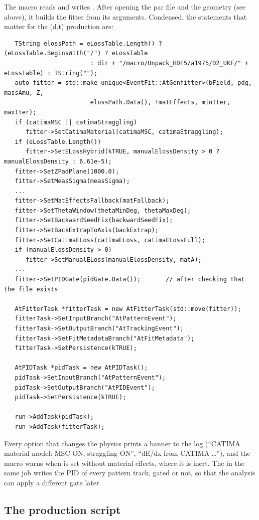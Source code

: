 The macro reads  and writes .
After opening the par file and the geometry (see above), it builds the fitter from its arguments. Condensed, the
statements that matter for the (d,t) production are:
\begingroup\footnotesize
\begin{verbatim}
   TString elossPath = eLossTable.Length() ? (eLossTable.BeginsWith("/") ? eLossTable
                        : dir + "/macro/Unpack_HDF5/a1975/D2_UKF/" + eLossTable) : TString("");
   auto fitter = std::make_unique<EventFit::AtGenfitter>(bField, pdg, massAmu, Z,
                        elossPath.Data(), !matEffects, minIter, maxIter);
   if (catimaMSC || catimaStraggling)
      fitter->SetCatimaMaterial(catimaMSC, catimaStraggling);
   if (eLossTable.Length())
      fitter->SetELossHybrid(kTRUE, manualElossDensity > 0 ? manualElossDensity : 6.61e-5);
   fitter->SetZPadPlane(1000.0);
   fitter->SetMeasSigma(measSigma);
   ...
   fitter->SetMatEffectsFallback(matFallback);
   fitter->SetThetaWindow(thetaMinDeg, thetaMaxDeg);
   fitter->SetBackwardSeedFix(backwardSeedFix);
   fitter->SetBackExtrapToAxis(backExtrap);
   fitter->SetCatimaELoss(catimaELoss, catimaELossFull);
   if (manualElossDensity > 0)
      fitter->SetManualELoss(manualElossDensity, matA);
   ...
   fitter->SetPIDGate(pidGate.Data());       // after checking that the file exists

   AtFitterTask *fitterTask = new AtFitterTask(std::move(fitter));
   fitterTask->SetInputBranch("AtPatternEvent");
   fitterTask->SetOutputBranch("AtTrackingEvent");
   fitterTask->SetFitMetadataBranch("AtFitMetadata");
   fitterTask->SetPersistence(kTRUE);

   AtPIDTask *pidTask = new AtPIDTask();
   pidTask->SetInputBranch("AtPatternEvent");
   pidTask->SetOutputBranch("AtPIDEvent");
   pidTask->SetPersistence(kTRUE);

   run->AddTask(pidTask);
   run->AddTask(fitterTask);
\end{verbatim}
\endgroup
Every option that changes the physics prints a banner to the log (``CATIMA material model: MSC ON, straggling ON'',
``dE/dx from CATIMA \dots''), and the macro warns when  is set without material effects, where it is
inert. The  in the same job writes the PID of every pattern track, gated or not, so that the analysis
can apply a different gate later.

\subsection{The production script}

